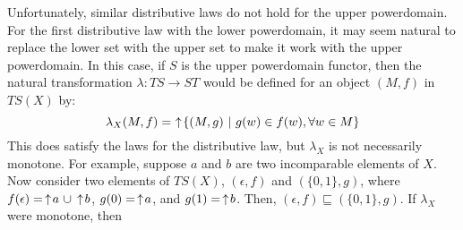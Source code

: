 %
%
%
%
%
Unfortunately, similar distributive laws do not hold for the upper powerdomain.  For the first distributive law with the lower powerdomain, it may seem natural to replace the lower set with the upper set to make it work with the upper powerdomain.  In this case, if $S$ is the upper powerdomain functor, then the natural transformation $\lambda:TS\to ST$ would be defined for an object $(M,f)$ in $TS(X)$ by:
\begin{displaymath}
\lambda_X(M,f) = \,\ua \{(M,g)\ |\ g(w)\in f(w), \forall w\in M\}
\end{displaymath}
This does satisfy the laws for the distributive law, but $\lambda_X$  is not necessarily monotone.  For example, suppose $a$ and $b$ are two incomparable elements of $X$.  Now consider two elements of $TS(X)$, $(\epsilon, f)$ and $(\{0,1\},g)$, where $f(\epsilon) = \,\uparrow\! a\ \cup \,\uparrow\! b$, $g(0) = \,\uparrow\! a$, and $g(1) = \,\uparrow\! b$.  Then, $(\epsilon, f) \sqsubseteq (\{0,1\},g)$.  If $\lambda_X$ were monotone, then 
